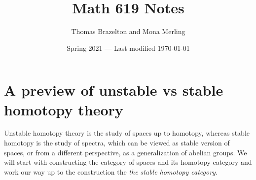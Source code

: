 \documentclass{article}[11pt]
\title{Math 619 Notes}
\author{Thomas Brazelton and Mona Merling}
\date{Spring 2021 --- Last modified \today}
\newlength{\storeparskip}
\begin{document}
\hypersetup{pageanchor=false}

\maketitle

\hypersetup{pageanchor=true}


\begingroup%
\setlength{\parskip}{\storeparskip}%
\tableofcontents{}
\endgroup%

\newpage




\section{A preview of unstable vs stable homotopy theory}


Unstable homotopy theory is the study of spaces up to homotopy, whereas stable homotopy is the study of spectra, which can be viewed as stable version of spaces, or from a different perspective, as a generalization of abelian groups. We will start with constructing the category of spaces and its homotopy category and work our way up to the construction the  \emph{the stable homotopy category}. 

\end{document}
